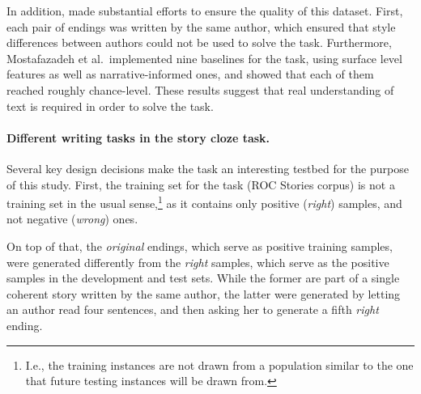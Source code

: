 \documentclass[11pt,a4paper]{article}
\newcommand{\resolved}[1]{}
\newcommand{\roy}[1]{{\color{orange}\textsc{[#1 --rs]}}}
\newcommand{\yc}[1]{{\color{bblue}\{\textit{#1}\}$_{yc}$}}
\newcommand{\nascomment}[1]{{\color{blue}\textsc{[#1 --nas]}}}
\newcommand{\clinic}[1]{{\color{magenta}\textsc{[#1 --CLINIC]}}}
\renewcommand{\roy}[1]{{\color{orange}[#1 --rs]}}
\renewcommand{\roy}[1]{#1}
\renewcommand{\nascomment}[1]{}
\renewcommand{\yc}[1]{}
\begin{document}
In addition, \citet{Mostafazadeh:2016} made substantial efforts to ensure the quality of this dataset. 
First, each pair of endings was written by the same author, which
ensured that style differences between authors could not be used to solve the task. 
Furthermore, Mostafazadeh et al.~implemented nine baselines for the task, using surface level features as well as narrative-informed ones, and showed that each of them reached roughly chance-level.
These results suggest that real understanding of text is required in order to solve the task.

\paragraph{Different writing tasks in the story cloze task.}
Several key design decisions make the task an interesting testbed for the purpose of this study.\resolved{\clinic{Which purpose?}}
First, the training set for the task (ROC Stories corpus) is not a
training set in the usual sense,\footnote{I.e., the training
  instances are not drawn from a population similar to the one that future
  testing instances will be drawn from.%
}  as it contains only positive ({\it right}) samples, and not negative ({\it wrong}) ones. 
 \resolved{\yc{As far as I understand, this was intentional --- they didn't want
  people to pick up on random superfluous cues that can inevidently
  get into the data creation process, exactly the kind that our work
  picks up. Given that, stating this can be viewed as
  misunderstanding, I'm afraid.} \nascomment{We should maybe say that
  they did this intentionally and concede that our approach goes
  against the intentions of their task design.  But a task that
  insists that systems avoid using features that might encode one kind
of information (like style) is absurd.  Alternately, we could reframe
this not as ``things weren't controlled for'' but instead stick to the
facts here and just describe what they did without judgment.}}

On top of that, the {\it original} endings, which serve as positive training samples, were generated differently from the {\it right} samples, which serve as the positive samples in the development and test sets. 
While the former are part of a single coherent story written by the same author, the latter were generated by letting an author read four sentences, 
and then asking her to generate a fifth {\it right} ending. 
\end{document}
